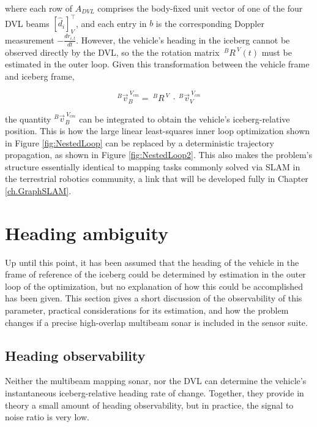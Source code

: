 where each row of $A_{DVL}$ comprises the body-fixed unit vector of one of the four DVL beams $\left[\hat{d}_i\right]_V^\intercal$, and each entry in $b$ is the corresponding Doppler measurement $ -\frac{dr_{i,t}}{dt} $. However, the vehicle's heading in the iceberg cannot be observed directly by the DVL, so the the rotation matrix $~^BR^{~V}(t) $ must be estimated in the outer loop. Given this transformation between the vehicle frame and iceberg frame, 

   \begin{equation}
   ^B\vec{v}^{~V_{cm}}_B= ~^BR^{~V}~ \cdot~^B\vec{v}^{~V_{cm}}_V
   \label{eqn:boomLinAlg}
\end{equation}

the quantity $^B\vec{v}^{~V_{cm}}_B$ can be integrated to obtain the vehicle's iceberg-relative position. This is how the large linear least-squares inner loop optimization shown in Figure \ref{fig:NestedLoop} can be replaced by a deterministic trajectory propagation, as shown in Figure \ref{fig:NestedLoop2}. This also makes the problem's structure essentially identical to mapping tasks commonly solved via SLAM in the terrestrial robotics community, a link that will be developed fully in Chapter \ref{ch.GraphSLAM}.

\section{Heading ambiguity}

Up until this point, it has been assumed that the heading of the vehicle in the frame of reference of the iceberg could be determined by estimation in the outer loop of the optimization, but no explanation of how this could be accomplished has been given. This section gives a short discussion of the observability of this parameter, practical considerations for its estimation, and how the problem changes if a precise high-overlap multibeam sonar is included in the sensor suite.

\subsection{Heading observability}

Neither the multibeam mapping sonar, nor the DVL can determine the vehicle's instantaneous iceberg-relative heading rate of change. Together, they provide in theory a small amount of heading observability, but in practice, the signal to noise ratio is very low.


